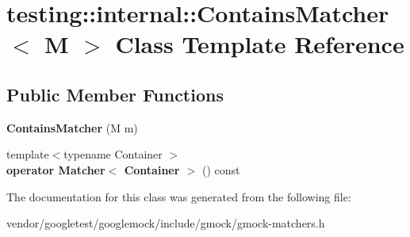 \hypertarget{classtesting_1_1internal_1_1_contains_matcher}{}\section{testing\+:\+:internal\+:\+:Contains\+Matcher$<$ M $>$ Class Template Reference}
\label{classtesting_1_1internal_1_1_contains_matcher}
\subsection*{Public Member Functions}
\begin{DoxyCompactItemize}
\item 
\mbox{\label{classtesting_1_1internal_1_1_contains_matcher_a063d429bb4e59087ecdd51a037b8128a}} 
{\bfseries Contains\+Matcher} (M m)
\item 
\mbox{\label{classtesting_1_1internal_1_1_contains_matcher_a18ed41b23e9d1cbc9c810baef7cf98a1}} 
{\footnotesize template$<$typename Container $>$ }\\{\bfseries operator Matcher$<$ Container $>$} () const
\end{DoxyCompactItemize}


The documentation for this class was generated from the following file\+:\begin{DoxyCompactItemize}
\item 
vendor/googletest/googlemock/include/gmock/gmock-\/matchers.\+h\end{DoxyCompactItemize}

